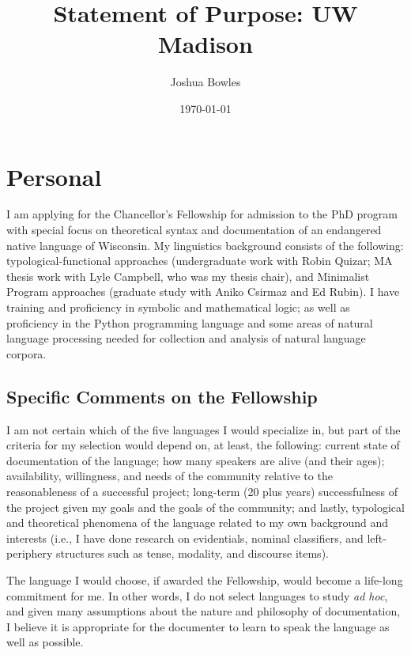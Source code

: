 \documentclass[11pt]{article}
\begin{document}
\author{Joshua Bowles}
\title{Statement of Purpose: UW Madison}
\date{\today}


\maketitle
\section{Personal}
I am applying for the Chancellor's Fellowship for admission to the PhD program with special focus on theoretical syntax and documentation of an endangered native language of Wisconsin. My linguistics background consists of the following: typological-functional approaches (undergraduate work with Robin Quizar; MA thesis work with Lyle Campbell, who was my thesis chair), and Minimalist Program approaches (graduate study with Aniko Csirmaz and Ed Rubin). I have training and proficiency in symbolic and mathematical logic; as well as proficiency in the Python programming language and some areas of natural language processing needed for collection and analysis of natural language corpora.  

\subsection{Specific Comments on the Fellowship}
I am not certain which of the five languages I would specialize in, but part of the criteria for my selection would depend on, at least, the following: current state of documentation of the language; how many speakers are alive (and their ages); availability, willingness, and needs of the community relative to the reasonableness of a successful project; long-term (20 plus years) successfulness of the project given my goals and the goals of the community; and lastly, typological and theoretical phenomena of the language related to my own background and interests (i.e., I have done research on evidentials, nominal classifiers, and left-periphery structures such as tense, modality, and discourse items). 

The language I would choose, if awarded the Fellowship, would become a life-long commitment for me. In other words, I do not select languages to study \textsl{ad hoc}, and given many assumptions about the nature and philosophy of documentation, I believe it is appropriate for the documenter to learn to speak the language as well as possible.
\end{document}

